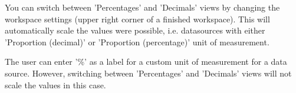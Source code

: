 \documentclass[00_mcda_tutorial.tex]{subfiles}
\begin{document}
\noindent You can switch between 'Percentages' and 'Decimals' views by changing the workspace settings (upper right corner of a finished workspace). This will automatically scale the values were possible, i.e. datasources with either 'Proportion (decimal)' or 'Proportion (percentage)' unit of measurement.
\newline

\noindent The user can enter '\%' as a label for a custom unit of measurement  for a data source. However, switching between 'Percentages' and 'Decimals' views will not scale the values in this case.
\end{document}
